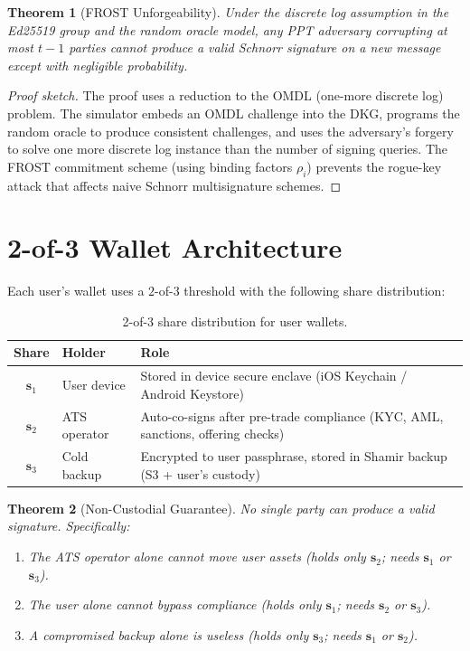 \documentclass[11pt,a4paper]{article}
\newtheorem{theorem}{Theorem}[section]
\begin{document}
\begin{theorem}[FROST Unforgeability]
\label{thm:frost-uf}
Under the discrete log assumption in the Ed25519 group and the random
oracle model, any PPT adversary corrupting at most $t-1$ parties
cannot produce a valid Schnorr signature on a new message except with
negligible probability.
\end{theorem}

\begin{proof}[Proof sketch]
The proof uses a reduction to the OMDL (one-more discrete log)
problem.  The simulator embeds an OMDL challenge into the DKG,
programs the random oracle to produce consistent challenges, and
uses the adversary's forgery to solve one more discrete log instance
than the number of signing queries.  The FROST commitment scheme
(using binding factors $\rho_i$) prevents the rogue-key attack that
affects naive Schnorr multisignature schemes.
\end{proof}

\section{2-of-3 Wallet Architecture}
\label{sec:wallet}

Each user's wallet uses a $2$-of-$3$ threshold with the following share
distribution:

\begin{table}[h]
\centering
\begin{tabular}{clp{7.5cm}}
\toprule
\textbf{Share} & \textbf{Holder} & \textbf{Role} \\
\midrule
$\mathbf{s}_1$ & User device & Stored in device secure enclave
  (iOS Keychain / Android Keystore) \\
$\mathbf{s}_2$ & ATS operator & Auto-co-signs after pre-trade compliance
  (KYC, AML, sanctions, offering checks) \\
$\mathbf{s}_3$ & Cold backup & Encrypted to user passphrase, stored in
  Shamir backup (S3 + user's custody) \\
\bottomrule
\end{tabular}
\caption{2-of-3 share distribution for user wallets.}
\label{tab:shares}
\end{table}

\begin{theorem}[Non-Custodial Guarantee]
\label{thm:non-custodial}
No single party can produce a valid signature.  Specifically:
\begin{enumerate}[nosep]
  \item The ATS operator alone cannot move user assets (holds only
        $\mathbf{s}_2$; needs $\mathbf{s}_1$ or $\mathbf{s}_3$).
  \item The user alone cannot bypass compliance (holds only
        $\mathbf{s}_1$; needs $\mathbf{s}_2$ or $\mathbf{s}_3$).
  \item A compromised backup alone is useless (holds only
        $\mathbf{s}_3$; needs $\mathbf{s}_1$ or $\mathbf{s}_2$).
\end{enumerate}
\end{theorem}
\end{document}
